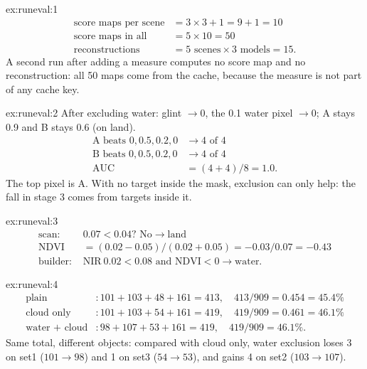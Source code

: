 
\begin{solution}{ex:runeval:1}
\begin{align*}
\text{score maps per scene} &= 3 \times 3 + 1 = 9 + 1 = 10\\
\text{score maps in all} &= 5 \times 10 = 50\\
\text{reconstructions} &= 5 \text{ scenes} \times 3 \text{ models} = 15.
\end{align*}
A second run after adding a measure computes no score map and no reconstruction: all 50 maps come from the cache,
because the measure is not part of any cache key.
\end{solution}

\begin{solution}{ex:runeval:2}
After excluding water: glint $\to 0$, the 0.1 water pixel $\to 0$; A stays 0.9 and B stays 0.6 (on land).
\begin{align*}
\text{A beats } 0, 0.5, 0.2, 0 &\to 4 \text{ of } 4\\
\text{B beats } 0, 0.5, 0.2, 0 &\to 4 \text{ of } 4\\
\text{AUC} &= (4 + 4)/8 = 1.0.
\end{align*}
The top pixel is A. With no target inside the mask, exclusion can only help: the fall in stage 3 comes from targets
inside it.
\end{solution}

\begin{solution}{ex:runeval:3}
\begin{align*}
\text{scan: } & 0.07 < 0.04? \text{ No} \to \text{land}\\
\mathrm{NDVI} &= (0.02 - 0.05)/(0.02 + 0.05) = -0.03 / 0.07 = -0.43\\
\text{builder: } & \mathrm{NIR}\ 0.02 < 0.08 \text{ and } \mathrm{NDVI} < 0 \to \text{water.}
\end{align*}
\end{solution}

\begin{solution}{ex:runeval:4}
\begin{align*}
\text{plain} &: 101 + 103 + 48 + 161 = 413, \quad 413/909 = 0.454 = 45.4\%\\
\text{cloud only} &: 101 + 103 + 54 + 161 = 419, \quad 419/909 = 0.461 = 46.1\%\\
\text{water + cloud} &: 98 + 107 + 53 + 161 = 419, \quad 419/909 = 46.1\%.
\end{align*}
Same total, different objects: compared with cloud only, water exclusion loses 3 on set1 ($101 \to 98$) and 1 on set3
($54 \to 53$), and gains 4 on set2 ($103 \to 107$).
\end{solution}

